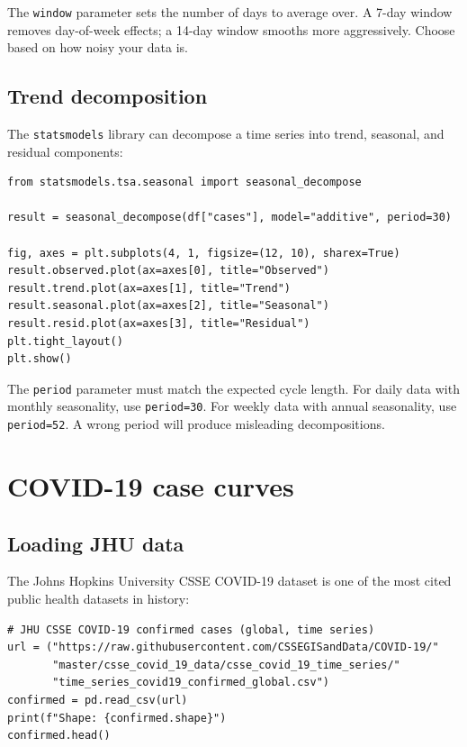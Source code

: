 \begin{pythontip}
The \texttt{window} parameter sets the number of days to average over. A 7-day window removes day-of-week effects; a 14-day window smooths more aggressively. Choose based on how noisy your data is.
\end{pythontip}

\subsection{Trend decomposition}

The \texttt{statsmodels} library can decompose a time series into trend, seasonal, and residual components:

\begin{verbatim}
from statsmodels.tsa.seasonal import seasonal_decompose

result = seasonal_decompose(df["cases"], model="additive", period=30)

fig, axes = plt.subplots(4, 1, figsize=(12, 10), sharex=True)
result.observed.plot(ax=axes[0], title="Observed")
result.trend.plot(ax=axes[1], title="Trend")
result.seasonal.plot(ax=axes[2], title="Seasonal")
result.resid.plot(ax=axes[3], title="Residual")
plt.tight_layout()
plt.show()
\end{verbatim}

\begin{warningbox}
The \texttt{period} parameter must match the expected cycle length. For daily data with monthly seasonality, use \texttt{period=30}. For weekly data with annual seasonality, use \texttt{period=52}. A wrong period will produce misleading decompositions.
\end{warningbox}

\section{COVID-19 case curves}

\subsection{Loading JHU data}

The Johns Hopkins University CSSE COVID-19 dataset is one of the most cited public health datasets in history:

\begin{verbatim}
# JHU CSSE COVID-19 confirmed cases (global, time series)
url = ("https://raw.githubusercontent.com/CSSEGISandData/COVID-19/"
       "master/csse_covid_19_data/csse_covid_19_time_series/"
       "time_series_covid19_confirmed_global.csv")
confirmed = pd.read_csv(url)
print(f"Shape: {confirmed.shape}")
confirmed.head()
\end{verbatim}

